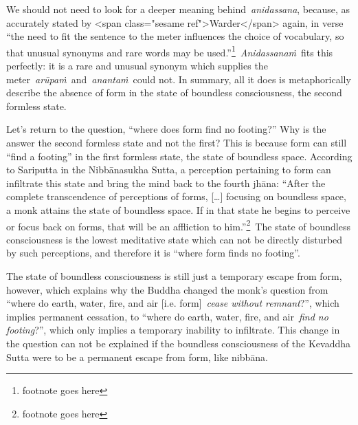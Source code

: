 \documentclass[10pt, openany]{book}
\begin{document}
We should not need to look for a deeper meaning behind \textit{anidassana}, because, as accurately stated by <span class="sesame ref">Warder</span> again, in verse “the need to fit the sentence to the meter influences the choice of vocabulary, so that unusual synonyms and rare words may be used.”\footnote{footnote goes here} \textit{Anidassanaṁ} fits this perfectly: it is a rare and unusual synonym which supplies the meter \textit{arūpaṁ} and \textit{anantaṁ} could not. In summary, all it does is metaphorically describe the absence of form in the state of boundless consciousness, the second formless state.


Let's return to the question, “where does form find no footing?” Why is the answer the second formless state and not the first? This is because form can still “find a footing” in the first formless state, the state of boundless space. According to Sariputta in the Nibbānasukha Sutta, a perception pertaining to form can infiltrate this state and bring the mind back to the fourth jhāna: “After the complete transcendence of perceptions of forms, […] focusing on boundless space, a monk attains the state of boundless space. If in that state he begins to perceive or focus back on forms, that will be an affliction to him.”\footnote{footnote goes here} The state of boundless consciousness is the lowest meditative state which can not be directly disturbed by such perceptions, and therefore it is “where form finds no footing”.


The state of boundless consciousness is still just a temporary escape from form, however, which explains why the Buddha changed the monk's question from “where do earth, water, fire, and air [i.e. form] \textit{cease without remnant}?”, which implies permanent cessation, to “where do earth, water, fire, and air \textit{find no footing}?”, which only implies a temporary inability to infiltrate. This change in the question can not be explained if the boundless consciousness of the Kevaddha Sutta were to be a permanent escape from form, like nibbāna.
\end{document}
